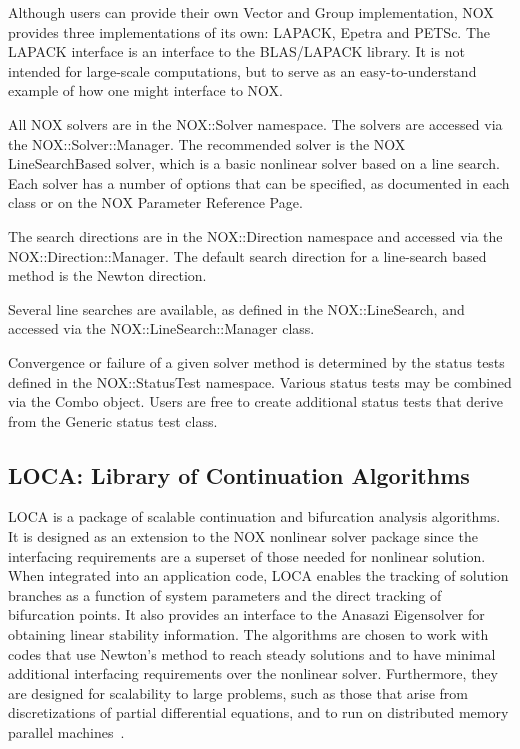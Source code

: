 \documentclass[acmtoms,acmnow]{acmtrans2m}
\begin{document}
Although users can provide their own Vector and Group implementation,
NOX provides three implementations of its own: LAPACK, Epetra and
PETSc.  The LAPACK interface is an interface to the BLAS/LAPACK
library. It is not intended for large-scale computations, but to serve
as an easy-to-understand example of how one might interface to
NOX.

All NOX solvers are in the NOX::Solver namespace. The solvers are
accessed via the NOX::Solver::Manager. The recommended solver is the
NOX LineSearchBased solver, which is a basic nonlinear solver based on
a line search.  Each solver has a number of options that can be
specified, as documented in each class or on the NOX Parameter
Reference Page.

The search directions are in the NOX::Direction namespace and accessed
via the NOX::Direction::Manager. The default search direction for a
line-search based method is the Newton direction.
 
Several line searches are available, as defined in the
NOX::LineSearch, and accessed via the NOX::LineSearch::Manager
class.

Convergence or failure of a given solver method is determined by the
status tests defined in the NOX::StatusTest namespace. Various status
tests may be combined via the Combo object. Users are free to create
additional status tests that derive from the Generic status test
class.

\subsection{LOCA: Library of Continuation Algorithms}


LOCA is a package of scalable continuation and bifurcation analysis algorithms.
It is designed as an extension to the NOX nonlinear solver package since
the interfacing requirements are a superset of those needed for nonlinear solution.
When integrated into an application code, 
LOCA enables the tracking of solution branches as a function of system 
parameters and the direct tracking of bifurcation points. It also provides
an interface to the Anasazi Eigensolver for obtaining linear stability 
information.  The algorithms are chosen to work with codes that use
Newton's method to reach steady solutions and to have minimal 
additional interfacing requirements over the nonlinear solver.
Furthermore, they are designed for scalability to
large problems, such as those that arise from 
discretizations of partial differential equations, and to run on distributed
memory parallel machines~\cite{LOCA-MPSalsa-paper}.  
\end{document}
